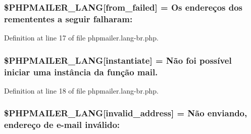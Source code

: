 \subsubsection[{\texorpdfstring{\$\+P\+H\+P\+M\+A\+I\+L\+E\+R\+\_\+\+L\+A\+NG}{$PHPMAILER_LANG}}]{\setlength{\rightskip}{0pt plus 5cm}\$P\+H\+P\+M\+A\+I\+L\+E\+R\+\_\+\+L\+A\+NG\mbox{[}\textquotesingle{}from\+\_\+failed\textquotesingle{}\mbox{]} = \textquotesingle{}Os endereços dos remententes {\bf a} seguir falharam\+: \textquotesingle{}}\hypertarget{phpmailer_8lang-br_8php_adf832ae12155a09be077c6d5e4fd7e22}{}\label{phpmailer_8lang-br_8php_adf832ae12155a09be077c6d5e4fd7e22}


Definition at line 17 of file phpmailer.\+lang-\/br.\+php.

\subsubsection[{\texorpdfstring{\$\+P\+H\+P\+M\+A\+I\+L\+E\+R\+\_\+\+L\+A\+NG}{$PHPMAILER_LANG}}]{\setlength{\rightskip}{0pt plus 5cm}\$P\+H\+P\+M\+A\+I\+L\+E\+R\+\_\+\+L\+A\+NG\mbox{[}\textquotesingle{}instantiate\textquotesingle{}\mbox{]} = \textquotesingle{}Não foi possível iniciar uma instância da função mail.\textquotesingle{}}\hypertarget{phpmailer_8lang-br_8php_ad58dde16780f4770ccf4dd282ea1f5ad}{}\label{phpmailer_8lang-br_8php_ad58dde16780f4770ccf4dd282ea1f5ad}


Definition at line 18 of file phpmailer.\+lang-\/br.\+php.

\subsubsection[{\texorpdfstring{\$\+P\+H\+P\+M\+A\+I\+L\+E\+R\+\_\+\+L\+A\+NG}{$PHPMAILER_LANG}}]{\setlength{\rightskip}{0pt plus 5cm}\$P\+H\+P\+M\+A\+I\+L\+E\+R\+\_\+\+L\+A\+NG\mbox{[}\textquotesingle{}invalid\+\_\+address\textquotesingle{}\mbox{]} = \textquotesingle{}Não enviando, endereço de {\bf e}-\/mail inválido\+: \textquotesingle{}}\hypertarget{phpmailer_8lang-br_8php_a42d61bcea4c79599ecb44fd062f54d47}{}\label{phpmailer_8lang-br_8php_a42d61bcea4c79599ecb44fd062f54d47}


